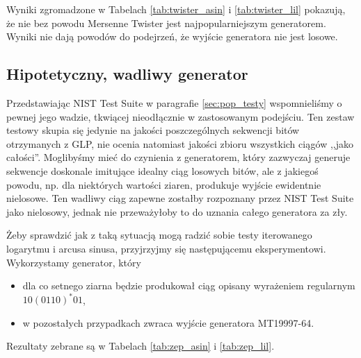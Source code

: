 \documentclass[a4paper,11pt,twoside]{book}
\theoremstyle{definition}
\begin{document}
Wyniki zgromadzone w Tabelach \ref{tab:twister_asin} i \ref{tab:twister_lil} pokazują, że nie bez powodu Mersenne Twister jest najpopularniejszym generatorem. Wyniki nie dają powodów do podejrzeń, że wyjście generatora nie jest losowe.

\FloatBarrier
\subsection{Hipotetyczny, wadliwy generator}
\label{subsec:zepsuty}
Przedstawiając NIST Test Suite w paragrafie \ref{sec:pop_testy} wspomnieliśmy o pewnej jego wadzie, tkwiącej nieodłącznie w zastosowanym podejściu. Ten zestaw testowy skupia się jedynie na jakości poszczególnych sekwencji bitów otrzymanych z GLP, nie ocenia natomiast jakości zbioru wszystkich ciągów ,,jako całości''. Moglibyśmy mieć do czynienia z generatorem, który zazwyczaj generuje sekwencje doskonale imitujące idealny ciąg losowych bitów, ale z jakiegoś powodu, np. dla niektórych wartości ziaren, produkuje wyjście ewidentnie nielosowe. Ten wadliwy ciąg zapewne zostałby rozpoznany przez NIST Test Suite jako nielosowy, jednak nie przeważyłoby to do uznania całego generatora za zły.

Żeby sprawdzić jak z taką sytuacją mogą radzić sobie testy iterowanego logarytmu i arcusa sinusa, przyjrzyjmy się następującemu eksperymentowi. Wykorzystamy generator, który
\begin{itemize}
  \setlength\itemsep{1pt}
 \item dla co setnego ziarna będzie produkował ciąg opisany wyrażeniem regularnym $10(0110)^*01$,
 \item w pozostałych przypadkach zwraca wyjście generatora MT19997-64.
\end{itemize}
Rezultaty zebrane są w Tabelach \ref{tab:zep_asin} i \ref{tab:zep_lil}.
\end{document}
